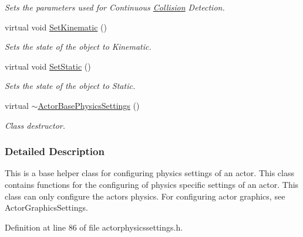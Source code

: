\begin{DoxyCompactItemize}
\begin{DoxyCompactList}\small\item\em Sets the parameters used for Continuous \hyperlink{classMezzanine_1_1Collision}{Collision} Detection. \item\end{DoxyCompactList}\item 
virtual void \hyperlink{classMezzanine_1_1ActorBasePhysicsSettings_a3b01243f038e30eb39b04f8e38fb8a14}{SetKinematic} ()
\begin{DoxyCompactList}\small\item\em Sets the state of the object to Kinematic. \item\end{DoxyCompactList}\item 
virtual void \hyperlink{classMezzanine_1_1ActorBasePhysicsSettings_ac72f39fa6bc9e2f050fdf90e42dd0deb}{SetStatic} ()
\begin{DoxyCompactList}\small\item\em Sets the state of the object to Static. \item\end{DoxyCompactList}\item 
\hypertarget{classMezzanine_1_1ActorBasePhysicsSettings_a6273131ed9e51182abde28d5af4ded83}{
virtual \hyperlink{classMezzanine_1_1ActorBasePhysicsSettings_a6273131ed9e51182abde28d5af4ded83}{$\sim$ActorBasePhysicsSettings} ()}
\label{classMezzanine_1_1ActorBasePhysicsSettings_a6273131ed9e51182abde28d5af4ded83}

\begin{DoxyCompactList}\small\item\em Class destructor. \item\end{DoxyCompactList}\end{DoxyCompactItemize}


\subsubsection{Detailed Description}
This is a base helper class for configuring physics settings of an actor. This class contains functions for the configuring of physics specific settings of an actor. This class can only configure the actors physics. For configuring actor graphics, see ActorGraphicsSettings. 

Definition at line 86 of file actorphysicssettings.h.



